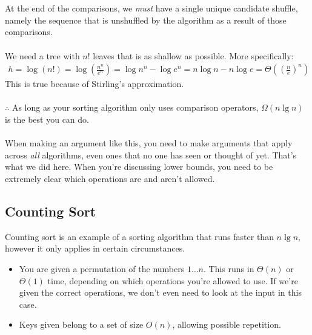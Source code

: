 \documentclass[]{article}
\theoremstyle{definition}
\begin{document}
			\\ \\
			At the end of the comparisons, we \emph{must} have a single unique candidate shuffle, namely the sequence that is unshuffled by the algorithm as a result of those comparisons.
			\\ \\
			We need a tree with $n!$ leaves that is as shallow as possible. More specifically:
			\begin{align*}
				h = \log(n!) = \log\left(\frac{n^n}{e^n}\right) = \log n^n - \log e^n = n \log n - n \log e = \Theta\left(\left(\frac{n}{e}\right)^n\right)
			\end{align*}
			This is true because of Stirling's approximation.
			\\ \\
			$\therefore$ As long as your sorting algorithm only uses comparison operators, $\Omega(n \lg n)$ is the best you can do.
			\\ \\
			When making an argument like this, you need to make arguments that apply across \emph{all} algorithms, even ones that no one has seen or thought of yet. That's what we did here. When you're discussing lower bounds, you need to be extremely clear which operations are and aren't allowed.
			\subsection{Counting Sort}
				Counting sort is an example of a sorting algorithm that runs faster than $n \lg n$, however it only applies in certain circumstances.
				\begin{itemize}
					\item You are given a permutation of the numbers $1 \ldots n$. This runs in $\Theta(n)$ or $\Theta(1)$ time, depending on which operations you're allowed to use. If we're given the correct operations, we don't even need to look at the input in this case.
					\item Keys given belong to a set of size $O(n)$, allowing possible repetition.
				\end{itemize}
\end{document}
